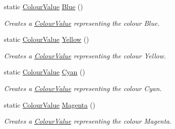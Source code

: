 \begin{DoxyCompactItemize}
static \hyperlink{classphys_1_1ColourValue}{ColourValue} \hyperlink{classphys_1_1ColourValue_aea3ab61fc98a5a5b4325780c11c712d8}{Blue} ()
\begin{DoxyCompactList}\small\item\em Creates a \hyperlink{classphys_1_1ColourValue}{ColourValue} representing the colour Blue. \item\end{DoxyCompactList}\item 
static \hyperlink{classphys_1_1ColourValue}{ColourValue} \hyperlink{classphys_1_1ColourValue_a7140182497bc7b894b68f4b17d08dfa4}{Yellow} ()
\begin{DoxyCompactList}\small\item\em Creates a \hyperlink{classphys_1_1ColourValue}{ColourValue} representing the colour Yellow. \item\end{DoxyCompactList}\item 
static \hyperlink{classphys_1_1ColourValue}{ColourValue} \hyperlink{classphys_1_1ColourValue_a1411e1bbb97fde45306342a90a7ce9a8}{Cyan} ()
\begin{DoxyCompactList}\small\item\em Creates a \hyperlink{classphys_1_1ColourValue}{ColourValue} representing the colour Cyan. \item\end{DoxyCompactList}\item 
static \hyperlink{classphys_1_1ColourValue}{ColourValue} \hyperlink{classphys_1_1ColourValue_a80b07a424539514f0a7410190dbc389d}{Magenta} ()
\begin{DoxyCompactList}\small\item\em Creates a \hyperlink{classphys_1_1ColourValue}{ColourValue} representing the colour Magenta. \item\end{DoxyCompactList}\end{DoxyCompactItemize}
